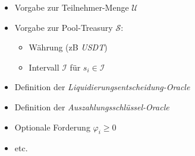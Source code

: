 

\begin{itemize}
  \item Vorgabe zur Teilnehmer-Menge $\mathcal{U}$
  \item Vorgabe zur Pool-Treasury $\mathcal{S}$:
  \begin{itemize}
  	\item Währung (zB \textit{USDT})
  	\item Intervall $\mathcal{I}$ für $s_i \in \mathcal{I}$
  \end{itemize}
  \item Definition der \textit{Liquidierungsentscheidung-Oracle}
  \item Definition der \textit{Auszahlungsschlüssel-Oracle}
  \item Optionale Forderung $\varphi_i \geq 0$
  \item etc.
\end{itemize}

\vspace{0.5cm}

